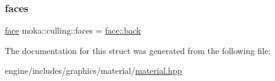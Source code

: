 \subsubsection{\texorpdfstring{faces}{faces}}
{\footnotesize\ttfamily \mbox{\hyperlink{namespacemoka_a262acd665924ba4041f64f7207b17cbe}{face}} moka\+::culling\+::faces = \mbox{\hyperlink{namespacemoka_a262acd665924ba4041f64f7207b17cbea469bba0a564235dfceede42db14f17b0}{face\+::back}}}



The documentation for this struct was generated from the following file\+:\begin{DoxyCompactItemize}
\item 
engine/includes/graphics/material/\mbox{\hyperlink{material_8hpp}{material.\+hpp}}\end{DoxyCompactItemize}
